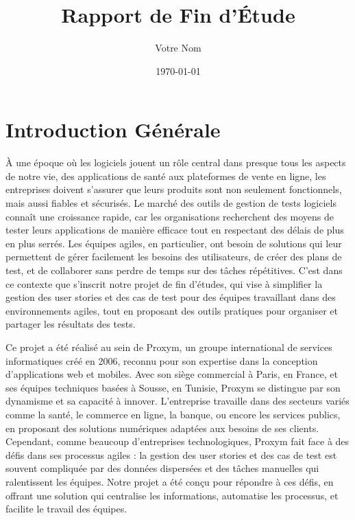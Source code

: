 \documentclass[12pt,a4paper]{report}
\title{\textbf{Rapport de Fin d'Étude}}
\author{Votre Nom}
\date{\today}
\begin{document}
\maketitle

\tableofcontents
\newpage

\chapter*{Introduction Générale}
À une époque où les logiciels jouent un rôle central dans presque tous les aspects de notre vie, des applications de santé aux plateformes de vente en ligne, les entreprises doivent s’assurer que leurs produits sont non seulement fonctionnels, mais aussi fiables et sécurisés. Le marché des outils de gestion de tests logiciels connaît une croissance rapide, car les organisations recherchent des moyens de tester leurs applications de manière efficace tout en respectant des délais de plus en plus serrés. Les équipes agiles, en particulier, ont besoin de solutions qui leur permettent de gérer facilement les besoins des utilisateurs, de créer des plans de test, et de collaborer sans perdre de temps sur des tâches répétitives. C’est dans ce contexte que s’inscrit notre projet de fin d’études, qui vise à simplifier la gestion des user stories et des cas de test pour des équipes travaillant dans des environnements agiles, tout en proposant des outils pratiques pour organiser et partager les résultats des tests.

Ce projet a été réalisé au sein de Proxym, un groupe international de services informatiques créé en 2006, reconnu pour son expertise dans la conception d’applications web et mobiles. Avec son siège commercial à Paris, en France, et ses équipes techniques basées à Sousse, en Tunisie, Proxym se distingue par son dynamisme et sa capacité à innover. L’entreprise travaille dans des secteurs variés comme la santé, le commerce en ligne, la banque, ou encore les services publics, en proposant des solutions numériques adaptées aux besoins de ses clients. Cependant, comme beaucoup d’entreprises technologiques, Proxym fait face à des défis dans ses processus agiles : la gestion des user stories et des cas de test est souvent compliquée par des données dispersées et des tâches manuelles qui ralentissent les équipes. Notre projet a été conçu pour répondre à ces défis, en offrant une solution qui centralise les informations, automatise les processus, et facilite le travail des équipes.
\end{document}
